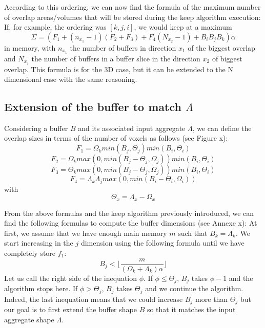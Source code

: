 \documentclass[conference]{IEEEtran}
\begin{document}
According to this ordering, we can now find the formula of the maximum number of overlap areas/volumes that will be stored during the keep algorithm execution:
If, for example, the ordering was $[k,j,i]$, we would keep at a maximum $$\Sigma = (F_1 + (n_{x_1}-1)(F_2 + F_3) + F_4(N_{x_2}-1) + B_iB_jB_k)\alpha$$ in memory, with $n_{x_1}$ the number of buffers in direction $x_1$ of the biggest overlap and $N_{x_2}$ the number of buffers in a buffer slice in the direction $x_2$ of biggest overlap.
This formula is for the 3D case, but it can be extended to the N dimensional case with the same reasoning.

\subsection{Extension of the buffer to match $\Lambda$}
Considering a buffer $B$ and its associated input aggregate $\Lambda$, we can define the overlap sizes in terms of the number of voxels as follows (see Figure x):
$$F_1 = \Omega_k min(B_j, \Theta_j) min(B_i, \Theta_i)$$
$$F_2 = \Omega_k max(0, min(B_j - \Theta_j, \Omega_j)) min(B_i, \Theta_i)$$
$$F_3 = \Theta_k max(0, min(B_j - \Theta_j, \Omega_j)) min(B_i, \Theta_i)$$
$$F_4 = \Lambda_k \Lambda_j max(0, min(B_i - \Theta_i, \Omega_i))$$
with
$$\Theta_x = \Lambda_x - \Omega_x$$

From the above formulas and the keep algorithm previously introduced, we can find the following formulas to compute the buffer dimensions (see Annexe x):
At first, we assume that we have enough main memory $m$ such that $B_k = \Lambda_k$.
We start increasing in the $j$ dimension using the following formula until we have completely store $f_1$:
$$B_j < \lfloor \frac{m}{(\Omega_k + \Lambda_k)\alpha} \rfloor$$
Let us call the right side of the inequation $\phi$.
If $\phi \leq \Theta_j$, $B_j$ takes $\phi-1$ and the algorithm stops here.
If $\phi > \Theta_j$, $B_j$ takes $\Theta_j$ and we continue the algorithm.
Indeed, the last inequation means that we could increase $B_j$ more than $\Theta_j$ but our goal is to first extend the buffer shape $B$ so that it matches the input aggregate shape $\Lambda$. \\
\end{document}
